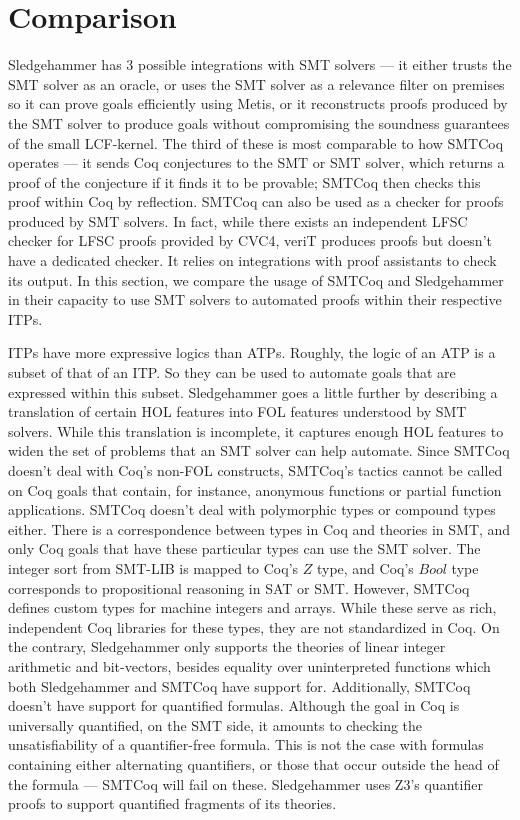 \documentclass{article}
\begin{document}
\section{Comparison}
\label{sec:comp}
	Sledgehammer has 3 possible integrations with SMT solvers --- 
	it either trusts the SMT solver as an oracle, or uses the 
	SMT solver as a relevance filter on premises so it can 
	prove goals efficiently using Metis, or it reconstructs 
	proofs produced by the SMT solver to produce goals 
	without compromising the soundness guarantees of the 
	small LCF-kernel. The third of these is most comparable 
	to how SMTCoq operates --- it sends Coq conjectures to the 
	SMT  or SMT solver, which returns a proof of the conjecture 
	if it finds it to be provable; SMTCoq then checks this 
	proof within Coq by reflection. SMTCoq can also be used as a 
	checker for proofs produced by SMT solvers. In fact, while 
	there exists an independent LFSC checker for LFSC proofs 
	provided by CVC4, veriT produces proofs but doesn't 
	have a dedicated checker. It relies on integrations with 
	proof assistants to check its output. In this section, we 
	compare the usage of SMTCoq and Sledgehammer in their 
	capacity to use SMT solvers to automated proofs within 
	their respective ITPs.
	
	ITPs have more expressive logics than ATPs. Roughly, the 
	logic of an ATP is a subset of that of an ITP. So they 
	can be used to automate goals that are expressed within 
	this subset. Sledgehammer goes a little further by 
	describing a translation of certain HOL features 
	into FOL features understood by SMT solvers. While this 
	translation is incomplete, it captures enough HOL features 
	to widen the set of problems that an SMT solver can 
	help automate. Since SMTCoq doesn't deal with
	Coq's non-FOL constructs, SMTCoq's tactics 
	cannot be called on Coq goals that contain, 
	for instance, anonymous functions or partial function 
	applications. SMTCoq doesn't deal with 
	polymorphic types or compound types either. There is a
	correspondence between types in Coq and theories in SMT, 
	and only Coq goals that have these particular types can 
	use the SMT solver. The integer sort from SMT-LIB is 
	mapped to Coq's $Z$ type, and Coq's $Bool$ type 
	corresponds to propositional reasoning in SAT or SMT.
	However, SMTCoq defines custom types 
	for machine integers and arrays. While these serve as 
	rich, independent Coq libraries for these types, 
	they are not standardized in Coq. On the contrary,
	Sledgehammer only supports the theories of linear 
	integer arithmetic and bit-vectors, besides equality 
	over uninterpreted functions which both Sledgehammer 
	and SMTCoq have support for. Additionally, SMTCoq 
	doesn't have support for quantified formulas. Although 
	the goal in Coq is universally quantified, on the SMT 
	side, it amounts to checking the unsatisfiability of a quantifier-free formula. This is not the case with 
	formulas containing either alternating quantifiers, or 
	those that occur outside the head of the formula --- 
	SMTCoq will fail on these. Sledgehammer uses Z3's 
	quantifier proofs to support quantified fragments of 
	its theories.
	
\end{document}
